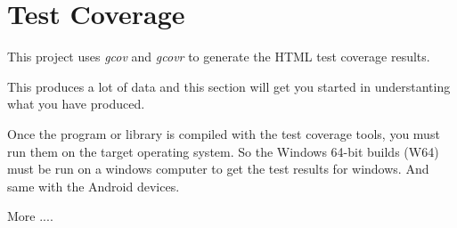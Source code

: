 \section{Test Coverage}\label{sec:TestCoverage}
This project uses \textit{gcov} and \textit{gcovr} to generate the HTML
test coverage results.

This produces a lot of data and this section will get you
started in understanting what you have produced.

Once the program or library is compiled with the test coverage
tools, you must run them on the target operating system.
So the Windows 64-bit builds (W64) must be run on a windows
computer to get the test results for windows.
And same with the Android devices.

More ....

